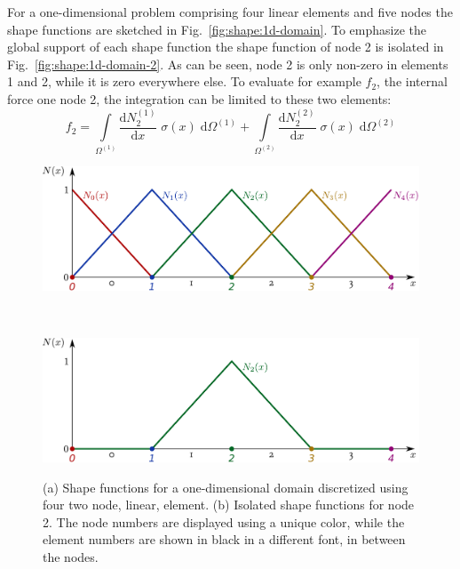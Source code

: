 \documentclass[times,namecite]{goose-article}
\begin{document}
For a one-dimensional problem comprising four linear elements and five nodes the shape functions are sketched in Fig.~\ref{fig:shape:1d-domain}. To emphasize the global support of each shape function the shape function of node 2 is isolated in Fig.~\ref{fig:shape:1d-domain-2}. As can be seen, node 2 is only non-zero in elements 1 and 2, while it is zero everywhere else. To evaluate for example $f_2$, the internal force one node 2, the integration can be limited to these two elements:
\begin{equation}
  f_2
  =
  \int\limits_{\Omega^{(1)}}
    \frac{\mathrm{d} N^{(1)}_2}{\mathrm{d} x} \;
    \sigma (x) \;
  \mathrm{d}\Omega^{(1)}
  +
  \int\limits_{\Omega^{(2)}}
    \frac{\mathrm{d} N^{(2)}_2}{\mathrm{d} x} \;
    \sigma (x) \;
  \mathrm{d}\Omega^{(2)}
\end{equation}

\begin{figure}[htp]
  \centering
  \captionsetup[subfigure]{justification=centering}
  \begin{minipage}[t]{.5\textwidth}
    \centering
    \includegraphics[width=1.\textwidth]{figures/shape-functions-1d.pdf}
    \label{fig:shape:1d-domain}
  \end{minipage}
  \\
  \begin{minipage}[t]{.5\textwidth}
    \centering
    \includegraphics[width=1.\textwidth]{figures/shape-functions-1d-node-2.pdf}
    \label{fig:shape:1d-domain-2}
  \end{minipage}
  \caption{(a) Shape functions for a one-dimensional domain discretized using four two node, linear, element. (b) Isolated shape functions for node 2. The node numbers are displayed using a unique color, while the element numbers are shown in black in a different font, in between the nodes.}
  \label{fig:shape:1d-domain:fig}
\end{figure}
\end{document}

